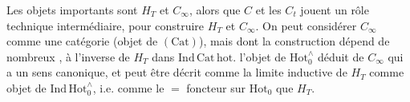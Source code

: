 Les objets importants sont $H_T$ et $C_\infty$, alors que $C$  et les $C_t$ jouent un rôle technique intermédiaire, pour construire $H_T$ et $C_\infty$. On peut considérer $C_\infty$ comme une catégorie (objet de $(\mathrm{Cat})$), mais dont la construction dépend de nombreux , à l'inverse de $H_T$ dans $\mathrm{Ind\,Cat\,hot}$.  l'objet de $\mathrm{Hot}_0^\wedge$ déduit de $C_\infty$ qui a un sens canonique, et peut être décrit comme la limite inductive de $H_T$ comme objet de $\mathrm{Ind\,Hot}_0^\wedge$, i.e. comme  le $=$ foncteur sur $\mathrm{Hot}_0$ que $H_T$.
